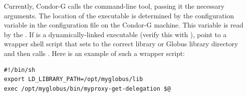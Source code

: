 Currently, Condor-G calls the
 command-line tool,
passing it the necessary arguments.
The location of the
 executable is determined by the
configuration variable
 in the configuration file
on the Condor-G machine.
This variable is read by the .
If
is a dynamically-linked executable
(verify this with ),
point
to a wrapper shell script that sets
 to the correct 
library or Globus library directory and then
calls .
Here is an example of such a wrapper script:

\footnotesize
\begin{verbatim}
#!/bin/sh
export LD_LIBRARY_PATH=/opt/myglobus/lib
exec /opt/myglobus/bin/myproxy-get-delegation $@
\end{verbatim}
\normalsize

